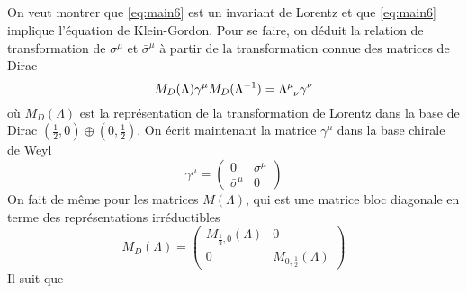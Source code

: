 \documentclass{article}
\numberwithin{equation}{section}
\theoremstyle{solution}
\begin{document}
\subsection{}
On veut montrer que \eqref{eq:main6} est un invariant de Lorentz et que \eqref{eq:main6} implique l'équation de Klein-Gordon. 
Pour se faire, on déduit la relation de transformation de $\sigma^{\mu}$ et $\bar{\sigma}^{\mu}$ à partir de la 
transformation connue des matrices de Dirac 
\begin{equation}\label{eq:gam6}
        M_D(\Lambda) \gamma^{\mu}M_D(\Lambda^{-1}) = \Lambda\indices{^{\mu}_{\nu}}\gamma^{\nu}
\end{equation} 
où $M_D(\Lambda)$ est la représentation de la transformation de Lorentz dans la base de Dirac $(\frac{1}{2}, 0) \oplus (0, \frac{1}{2})$. 
On écrit maintenant la matrice $\gamma^{\mu}$ dans la base chirale de Weyl
\begin{equation}
        \gamma^{\mu} = 
        \begin{pmatrix}
                0 & \sigma^{\mu} \\
                \bar{\sigma}^{\mu} & 0
        \end{pmatrix}
\end{equation} 
On fait de même pour les matrices $M(\Lambda)$, 
qui est une matrice bloc diagonale en terme des représentations irréductibles
\begin{equation}
        M_D(\Lambda) =
        \begin{pmatrix}
                M_{\frac{1}{2},0}(\Lambda) & 0 \\
        0 & M_{0, \frac{1}{2}}(\Lambda)
        \end{pmatrix}
\end{equation} 
Il suit que
\end{document}
